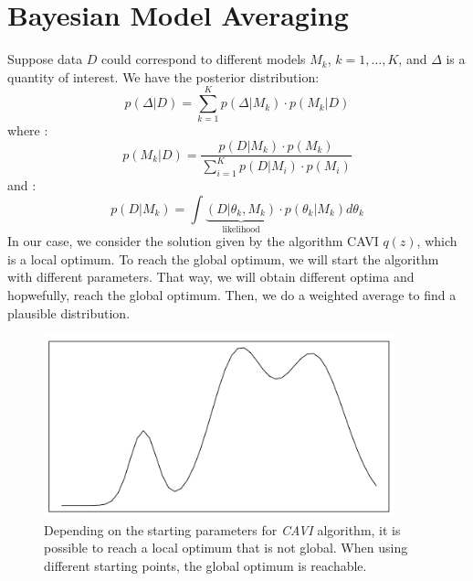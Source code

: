 \section{Bayesian Model Averaging}
Suppose data $D$ could correspond to different models $M_k$, $k = 1, \dots, K$, and $\Delta$ is a quantity of interest. We have the posterior distribution:
\begin{equation}
p(\Delta|D) = \sum_{k=1}^K p(\Delta|M_k)\cdot p(M_k|D)
\label{eq:prior_Delta}
\end{equation}
where :
\begin{equation}
p(M_k|D) = \frac{p(D|M_k)\cdot p(M_k)}{\sum_{i=1}^Kp(D|M_i)\cdot p(M_i)}
\end{equation}
and :
\begin{equation}
p(D|M_k) = \int \underbrace{(D|\theta_k,M_k)}_{\text{likelihood}} \cdot p(\theta_k|M_k)d\theta_k
\end{equation}
\newline
In our case, we consider the solution given by the algorithm CAVI $q(z)$, which is a local optimum. To reach the global optimum, we will start the algorithm with different parameters. That way, we will obtain different optima and hopwefully, reach the global optimum. Then, we do a weighted average to find a plausible distribution.

\begin{figure}[h]
\includegraphics[width=4in]{images/localOptimum.png}
\caption{\label{fig:localOptimum}Depending on the starting parameters for \textit{CAVI} algorithm, it is possible to reach a local optimum that is not global. When using different starting points, the global optimum is reachable.}
\end{figure}
